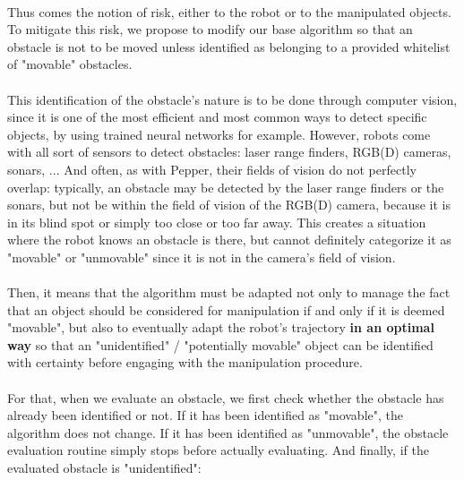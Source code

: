 \paragraph{} Thus comes the notion of risk, either to the robot or to the manipulated objects. To mitigate this risk, we propose to modify our base algorithm so that an obstacle is not to be moved unless identified as belonging to a provided whitelist of "movable" obstacles.

\paragraph{} This identification of the obstacle's nature is to be done through computer vision, since it is one of the most efficient and most common ways to detect specific objects, by using trained neural networks for example. However, robots come with all sort of sensors to detect obstacles: laser range finders, RGB(D) cameras, sonars, ... And often, as with Pepper, their fields of vision do not perfectly overlap: typically, an obstacle may be detected by the laser range finders or the sonars, but not be within the field of vision of the RGB(D) camera, because it is in its blind spot or simply too close or too far away. This creates a situation where the robot knows an obstacle is there, but cannot definitely categorize it as "movable" or "unmovable" since it is not in the camera's field of vision.

\paragraph{} Then, it means that the algorithm must be adapted not only to manage the fact that an object should be considered for manipulation if and only if it is deemed "movable", but also to eventually adapt the robot's trajectory \textbf{in an optimal way} so that an "unidentified" / "potentially movable" object can be identified with certainty before engaging with the manipulation procedure.

\paragraph{} For that, when we evaluate an obstacle, we first check whether the obstacle has already been identified or not. If it has been identified as "movable", the algorithm does not change. If it has been identified as "unmovable", the obstacle evaluation routine simply stops before actually evaluating. And finally, if the evaluated obstacle is "unidentified":

